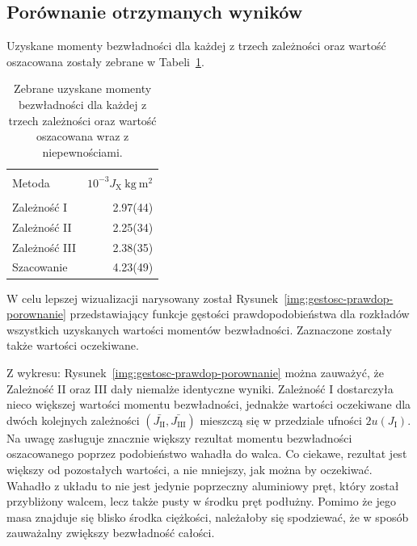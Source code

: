 \documentclass[twocolumn, a4paper, polish, 10pt]{article}
\newcommand{\JX}{\ensuremath{ J_{\mathrm{X}} }}
\newcommand{\JXn}[1]{\ensuremath{ J_{\mathrm{#1}} }}
\begin{document}
\subsection{Porównanie otrzymanych wyników}
Uzyskane momenty bezwładności dla każdej z trzech zależności oraz wartość oszacowana zostały zebrane w Tabeli~\ref{tab:porownanie-wynikow}.
\begin{table}[ht]
\begin{center}
\renewcommand*{\tablename}{Tabela}
\caption{\small
Zebrane uzyskane momenty bezwładności dla każdej z trzech zależności oraz wartość oszacowana wraz z niepewnościami.
\vspace{0.15cm}
    \label{tab:porownanie-wynikow}}
    {\small
    \begin{tabular}{l r}
    \hline \vspace{-0.35cm} \\
      Metoda & $10^{-3} \JX~\mathrm{kg~m^2}$ \\
      \hline \vspace{-0.2cm} \\
      Zależność I & 2.97(44) \\
      Zależność II & 2.25(34) \\
      Zależność III & 2.38(35) \\
      Szacowanie & 4.23(49) \\
    \hline
    \end{tabular}}
    \end{center}
\end{table}

W celu lepszej wizualizacji narysowany został Rysunek~\ref{img:gestosc-prawdop-porownanie} przedstawiający funkcje gęstości prawdopodobieństwa dla rozkładów wszystkich uzyskanych wartości momentów bezwładności.
Zaznaczone zostały także wartości oczekiwane.


Z wykresu: Rysunek~\ref{img:gestosc-prawdop-porownanie} można zauważyć, że Zależność II oraz III dały niemalże identyczne wyniki.
Zależność I dostarczyła nieco większej wartości momentu bezwładności, jednakże wartości oczekiwane dla dwóch kolejnych zależności $(\bar{\JXn{II}}, \bar{\JXn{III}})$ mieszczą się w przedziale ufności $2u(\JXn{I})$.
Na uwagę zasługuje znacznie większy rezultat momentu bezwładności oszacowanego poprzez podobieństwo wahadła do walca.
Co ciekawe, rezultat jest większy od pozostałych wartości, a nie mniejszy, jak można by oczekiwać.
Wahadło z układu to nie jest jedynie poprzeczny aluminiowy pręt, który został przybliżony walcem, lecz także pusty w środku pręt podłużny.
Pomimo że jego masa znajduje się blisko środka ciężkości, należałoby się spodziewać, że w sposób zauważalny zwiększy bezwładność całości.
\end{document}
